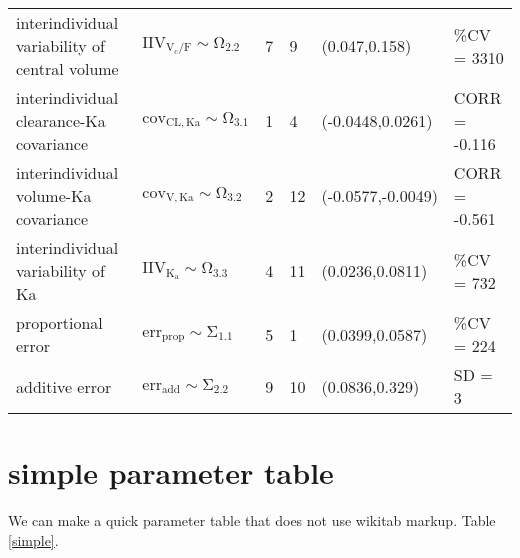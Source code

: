 \begin{table}[!htpb]
\begin{center}
\begin{tabular}{llllll}
   interindividual variability of central volume & $\mathrm{IIV_{V_{c}/F}\sim \Omega_{2.2}}$                                                                  & 7 $  $      & 9  & (0.047,0.158)     & \%CV = 3310  \\
   interindividual clearance-Ka covariance       & $\mathrm{cov_{CL,Ka} \sim \Omega_{3.1}}$                                                                   & 1 $  $      & 4  & (-0.0448,0.0261)  & CORR = -0.116 \\
   interindividual volume-Ka covariance          & $\mathrm{cov_{V,Ka} \sim \Omega_{3.2}}$                                                                    & 2 $  $      & 12 & (-0.0577,-0.0049) & CORR = -0.561 \\
   interindividual variability of Ka             & $\mathrm{IIV_{K_{a}}\sim \Omega_{3.3}}$                                                                    & 4 $  $      & 11 & (0.0236,0.0811)   & \%CV = 732   \\
   proportional error                            & $\mathrm{err_{prop}\sim \Sigma_{1.1}}$                                                                     & 5 $  $      & 1  & (0.0399,0.0587)   & \%CV = 224   \\
   additive error                                & $\mathrm{err_{add}\sim \Sigma_{2.2}}$                                                                      & 9 $  $      & 10 & (0.0836,0.329)    & SD = 3        \\ \hline
  \end{tabular}
 \end{center}
\end{table}\section{simple parameter table}
We can make a quick parameter table that does not use wikitab markup. Table \ref{simple}.
